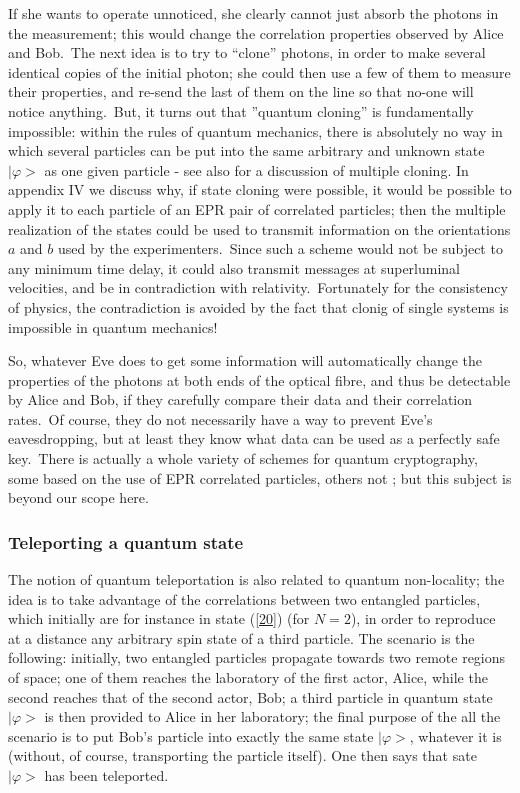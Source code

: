 \documentclass[12pt,onecolumn]{article}%
\begin{document}
If she wants to operate unnoticed, she clearly cannot just absorb the photons
in the measurement; this would change the correlation properties observed by
Alice and Bob.\ The next idea is to try to ``clone'' photons, in order to make
several identical copies of the initial photon; she could then use a few of
them to measure their properties, and re-send the last of them on the line so
that no-one will notice anything.\ But, it turns out that ''quantum cloning''
is fundamentally impossible: within the rules of quantum mechanics, there is
absolutely no way in which several particles can be put into the same
arbitrary and unknown state $\mid\varphi>$ as one given particle
\cite{Wooters-Zurek} \cite{Dieks} - see also \cite{Gisin-Massar} for a
discussion of multiple cloning. In appendix IV we discuss why, if state
cloning were possible, it would be possible to apply it to each particle of an
EPR pair of correlated particles; then the multiple realization of the states
could be used to transmit information on the orientations $a$ and $b$ used by
the experimenters.\ Since such a scheme would not be subject to any minimum
time delay, it could also transmit messages at superluminal velocities, and be
in contradiction with relativity.\ Fortunately for the consistency of physics,
the contradiction is avoided by the fact that clonig of single systems is
impossible in quantum mechanics!

So, whatever Eve does to get some information will automatically change the
properties of the photons at both ends of the optical fibre, and thus be
detectable by Alice and Bob, if they carefully compare their data and their
correlation rates.\ Of course, they do not necessarily have a way to prevent
Eve's eavesdropping, but at least they know what data can be used as a
perfectly safe key.\ There is actually a whole variety of schemes for quantum
cryptography, some based on the use of EPR correlated particles, others not
\cite{Bennett2}; but this subject is beyond our scope here.

\subsubsection{Teleporting a quantum state}

The notion of quantum teleportation \cite{Bennett1} is also related to quantum
non-locality; the idea is to take advantage of the correlations between two
entangled particles, which initially are for instance in state (\ref{20}) (for
$N=2$), in order to reproduce at a distance any arbitrary spin state of a
third particle. The scenario is the following: initially, two entangled
particles propagate towards two remote regions of space; one of them reaches
the laboratory of the first actor, Alice, while the second reaches that of the
second actor, Bob; a third particle in quantum state $\mid\varphi>$ is then
provided to Alice in her laboratory; the final purpose of the all the scenario
is to put Bob's particle into exactly the same state $\mid\varphi>$, whatever
it is (without, of course, transporting the particle itself). One then says
that sate $\mid\varphi>$ has been teleported.
\end{document}
